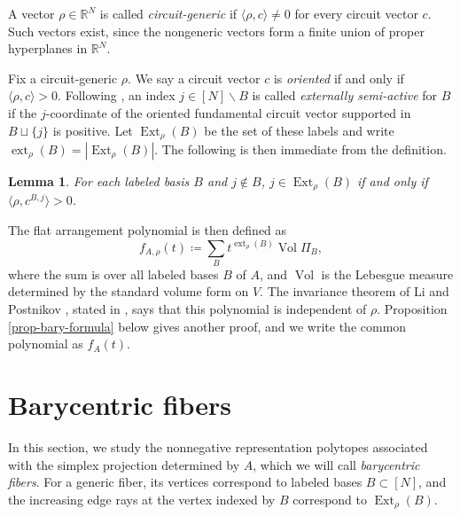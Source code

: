 \documentclass[12pt]{amsart}
\newtheorem{lemma}[theorem]{Lemma}
\numberwithin{equation}{section}
\numberwithin{theorem}{section}
\newcommand{\op}{\operatorname}
\newcommand{\R}{\mathbb{R}}
\begin{document}
A vector $\rho\in \R^N$ is called \emph{circuit-generic} if $\langle\rho,c\rangle\neq0$ for every circuit vector $c$. Such vectors exist, since the nongeneric vectors form a finite union of proper hyperplanes in $\mathbb{R}^N$.

Fix a circuit-generic $\rho$. We say a circuit vector $c$ is \emph{oriented} if and only if $\langle\rho,c\rangle>0$. Following \cite[Definition~3.1]{KMP}, an index $j\in [N]\backslash B$ is called \emph{externally semi-active} for $B$ if the $j$-coordinate of the oriented fundamental circuit vector supported in $B\sqcup\{j\}$ is positive.
Let $\op{Ext}_\rho(B)$ be the set of these labels and write $\op{ext}_{\rho}(B)=|\op{Ext}_\rho(B)|$.
The following is then immediate from the definition.

\begin{lemma}
  \label{lemma-sign}
  For each labeled basis $B$ and $j\notin B$, $j\in \op{Ext}_\rho(B)$ if and only if $\langle\rho,c^{B,j}\rangle>0$.
\end{lemma}

The flat arrangement polynomial is then defined as
\begin{equation}
  f_{A,\rho}(t)\coloneqq \sum_{B}t^{\op{ext}_{\rho}(B)}\op{Vol}\Pi_B,
\end{equation}
where the sum is over all labeled bases $B$ of $A$, and $\op{Vol}$ is the Lebesgue measure determined by the standard volume form on $V$. The invariance theorem of Li and Postnikov \cite{LP13}, stated in \cite[Theorem~3.4]{KMP}, says that this polynomial is independent of $\rho$. Proposition \ref{prop-bary-formula} below gives another proof, and we write the common polynomial as $f_A(t)$.


\section{Barycentric fibers}
\label{sec-barycentric-fibers}

In this section, we study the nonnegative representation polytopes associated with the simplex projection determined by $A$, which we will call \emph{barycentric fibers}. For a generic fiber, its vertices correspond to labeled bases $B\subset [N]$, and the increasing edge rays at the vertex indexed by $B$ correspond to $\op{Ext}_{\rho}(B)$.
\end{document}
